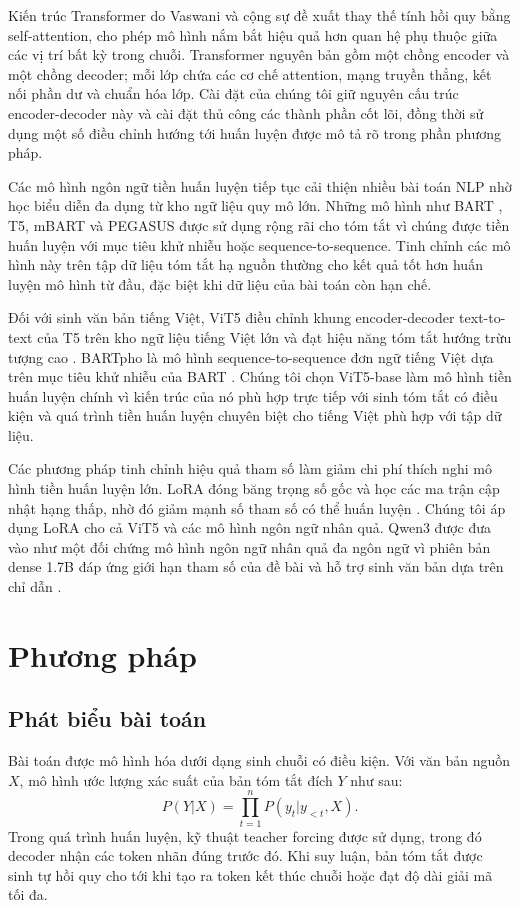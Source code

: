 \documentclass[conference]{IEEEtran}
\begin{document}
Kiến trúc Transformer do Vaswani và cộng sự đề xuất thay thế tính hồi quy bằng self-attention, cho phép mô hình nắm bắt hiệu quả hơn quan hệ phụ thuộc giữa các vị trí bất kỳ trong chuỗi. Transformer nguyên bản gồm một chồng encoder và một chồng decoder; mỗi lớp chứa các cơ chế attention, mạng truyền thẳng, kết nối phần dư và chuẩn hóa lớp. Cài đặt của chúng tôi giữ nguyên cấu trúc encoder-decoder này và cài đặt thủ công các thành phần cốt lõi, đồng thời sử dụng một số điều chỉnh hướng tới huấn luyện được mô tả rõ trong phần phương pháp.

Các mô hình ngôn ngữ tiền huấn luyện tiếp tục cải thiện nhiều bài toán NLP nhờ học biểu diễn đa dụng từ kho ngữ liệu quy mô lớn. Những mô hình như BART \cite{lewis2020bart}, T5, mBART và PEGASUS \cite{zhang2020pegasus} được sử dụng rộng rãi cho tóm tắt vì chúng được tiền huấn luyện với mục tiêu khử nhiễu hoặc sequence-to-sequence. Tinh chỉnh các mô hình này trên tập dữ liệu tóm tắt hạ nguồn thường cho kết quả tốt hơn huấn luyện mô hình từ đầu, đặc biệt khi dữ liệu của bài toán còn hạn chế.

Đối với sinh văn bản tiếng Việt, ViT5 điều chỉnh khung encoder-decoder text-to-text của T5 trên kho ngữ liệu tiếng Việt lớn và đạt hiệu năng tóm tắt hướng trừu tượng cao \cite{phan2022vit5}. BARTpho là mô hình sequence-to-sequence đơn ngữ tiếng Việt dựa trên mục tiêu khử nhiễu của BART \cite{tran2022bartpho}. Chúng tôi chọn ViT5-base làm mô hình tiền huấn luyện chính vì kiến trúc của nó phù hợp trực tiếp với sinh tóm tắt có điều kiện và quá trình tiền huấn luyện chuyên biệt cho tiếng Việt phù hợp với tập dữ liệu.

Các phương pháp tinh chỉnh hiệu quả tham số làm giảm chi phí thích nghi mô hình tiền huấn luyện lớn. LoRA đóng băng trọng số gốc và học các ma trận cập nhật hạng thấp, nhờ đó giảm mạnh số tham số có thể huấn luyện \cite{hu2022lora}. Chúng tôi áp dụng LoRA cho cả ViT5 và các mô hình ngôn ngữ nhân quả. Qwen3 được đưa vào như một đối chứng mô hình ngôn ngữ nhân quả đa ngôn ngữ vì phiên bản dense 1.7B đáp ứng giới hạn tham số của đề bài và hỗ trợ sinh văn bản dựa trên chỉ dẫn \cite{yang2025qwen3}.

\section{Phương pháp}

\subsection{Phát biểu bài toán}
Bài toán được mô hình hóa dưới dạng sinh chuỗi có điều kiện. Với văn bản nguồn $X$, mô hình ước lượng xác suất của bản tóm tắt đích $Y$ như sau:
\begin{equation}
P(Y|X) = \prod_{t=1}^{n} P(y_t | y_{<t}, X).
\end{equation}
Trong quá trình huấn luyện, kỹ thuật teacher forcing được sử dụng, trong đó decoder nhận các token nhãn đúng trước đó. Khi suy luận, bản tóm tắt được sinh tự hồi quy cho tới khi tạo ra token kết thúc chuỗi hoặc đạt độ dài giải mã tối đa.
\end{document}
